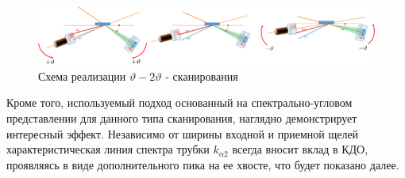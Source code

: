  \begin{figure}[H]
   \centering
   \includegraphics[width=1\textwidth]{images/theta_2theta_scan.png}
   \caption{Схема реализации $\vartheta - 2\vartheta$ - сканирования}
   \label{ris:theta_2theta_scan}
 \end{figure}
Кроме того, используемый подход основанный на спектрально-угловом представлении
для данного типа сканирования, наглядно демонстрирует интересный эффект.
 Независимо от ширины входной и приемной щелей характеристическая линия спектра
 трубки $k_{\alpha 2}$ всегда вносит вклад в КДО, проявляясь в виде дополнительного
 пика на ее хвосте, что будет показано далее.
